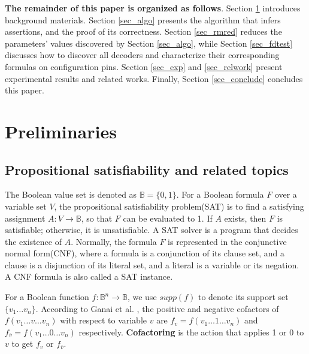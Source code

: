 \documentclass[journal]{IEEEtran}
\begin{document}
\textbf{The remainder of this paper is organized as follows}.
Section \ref{sec_prem} introduces background materials.
Section \ref{sec_algo} presents the algorithm that infers assertions,
and the proof of its correctness.
Section \ref{sec_rmred} reduces the parameters' values discovered by Section \ref{sec_algo},
while Section \ref{sec_fdtest} discusses how to discover all decoders and characterize their corresponding formulas on configuration pins.
Section \ref{sec_exp} and \ref{sec_relwork} present experimental results and related works.
Finally,
Section \ref{sec_conclude} concludes this paper.

\section{Preliminaries}\label{sec_prem}

\subsection{Propositional satisfiability and related topics}\label{subsec_SAT}
The Boolean value set is denoted as $\mathbb{B}=\{0,1\}$.
For a Boolean formula $F$ over a variable set $V$,
the propositional satisfiability problem(SAT) is to find a satisfying assignment $A:V\to \mathbb{B}$,
so that $F$ can be evaluated to 1.
If $A$ exists, then $F$ is satisfiable;
otherwise,
it is unsatisfiable.
A SAT solver is a program that decides the existence of $A$.
Normally,
the formula $F$ is represented in the conjunctive normal form(CNF),
where a formula is a conjunction of its clause set,
and a clause is a disjunction of its literal set,
and a literal is a variable or its negation.
A CNF formula is also called a SAT instance.



For a Boolean function $f:\mathbb{B}^n\to \mathbb{B}$,
we use $supp(f)$ to denote its support set $\{v_1\dots v_n\}$.
According to Ganai et al. \cite{Cofact},
the positive and negative cofactors of $f(v_1\dots v\dots v_n)$ with respect to variable
$v$ are $f_v=f(v_1\dots 1\dots v_n)$ and $f_{\overline{v}}=f(v_1\dots 0\dots v_n)$
respectively.
\textbf{Cofactoring} is the action that applies 1 or 0 to $v$ to get $f_v$ or $f_{\overline{v}}$.
\end{document}
